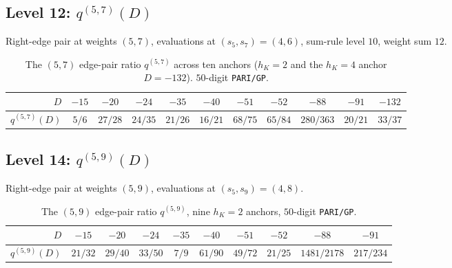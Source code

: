 \documentclass[11pt,a4paper]{amsart}
\theoremstyle{plain}
\theoremstyle{definition}
\newcommand{\qstr}[2]{q^{(#1,#2)}}
\begin{document}
\subsection{Level 12: $\qstr{5}{7}(D)$}\label{ss:lev4}

Right-edge pair at weights $(5, 7)$, evaluations at $(s_5, s_7) = (4, 6)$,
sum-rule level $10$, weight sum $12$.

\begin{table}[h]
\centering
\caption{The $(5,7)$ edge-pair ratio $\qstr{5}{7}$ across ten anchors
($h_K = 2$ and the $h_K = 4$ anchor $D = -132$). $50$-digit
\texttt{PARI/GP}.}\label{tab:level4}
\begin{tabular}{rcccccccccc}
\toprule
$D$ & $-15$ & $-20$ & $-24$ & $-35$ & $-40$ & $-51$ & $-52$ & $-88$ & $-91$ & $-132$\\
\midrule
$\qstr{5}{7}(D)$
 & $5/6$ & $27/28$ & $24/35$ & $21/26$ & $16/21$ & $68/75$ & $65/84$ & $280/363$ & $20/21$ & $33/37$\\
\bottomrule
\end{tabular}
\end{table}

\subsection{Level 14: $\qstr{5}{9}(D)$}\label{ss:lev5}

Right-edge pair at weights $(5, 9)$, evaluations at $(s_5, s_9) = (4, 8)$.

\begin{table}[h]
\centering
\caption{The $(5,9)$ edge-pair ratio $\qstr{5}{9}$, nine $h_K = 2$ anchors,
$50$-digit \texttt{PARI/GP}.}\label{tab:level5}
\begin{tabular}{rccccccccc}
\toprule
$D$ & $-15$ & $-20$ & $-24$ & $-35$ & $-40$ & $-51$ & $-52$ & $-88$ & $-91$\\
\midrule
$\qstr{5}{9}(D)$
 & $21/32$ & $29/40$ & $33/50$ & $7/9$ & $61/90$ & $49/72$ & $21/25$ & $1481/2178$ & $217/234$\\
\bottomrule
\end{tabular}
\end{table}

\end{document}
